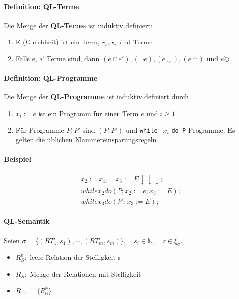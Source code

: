 \documentclass[12pt, a4paper]{article}
\begin{document}
\paragraph{Definition: QL-Terme}
Die Menge der \textbf{QL-Terme} ist induktiv definiert:
\begin{enumerate}
\item E (Gleichheit) ist ein Term, $r_i, x_i$ sind Terme
\item Falls e, e' Terme sind, dann $(e \cap e'), (\lnot e), (e \downarrow), (e \uparrow) \text{ und } e\circlearrowright$
\end{enumerate}


\paragraph{Definition: QL-Programme}
Die Menge der \textbf{QL-Programme} ist induktiv definiert durch

\begin{enumerate}
\item $x_i := e$ ist ein Programm für einen Term $e$ und $i \ge 1$
\item Für Programme $P,P'$ sind $(P; P')$ und \texttt{while } $x_i$ \texttt{do P} Programme. Es gelten die üblichen Klammereinsparungsregeln
\end{enumerate}

\paragraph{Beispiel}

\begin{align*}
&x_2 := x_1, \quad x_3 := E \downarrow\downarrow\downarrow; \\
& while x_2 do (P; x_2 := e; x_3 := E); \\
& while x_3 do (P'; x_3 := E);
\end{align*}


\paragraph{QL-Semantik}

Seien $\sigma = \{ (RT_1, s_1), \cdots, (RT_m, s_m) \},\quad s_i \in \mathbb{N}, \quad z \in \xi_\sigma$.
\begin{itemize}
\item $R^\emptyset_S:$ leere Relation der Stelligkeit s
\item $R_S:$ Menge der Relationen mit Stelligkeit
\item $R_{-1} = \{ R^\emptyset_0 \}$
\end{itemize}
\end{document}

